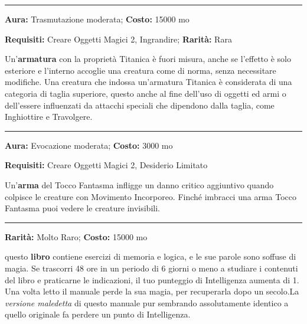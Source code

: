 \begin{multicols}{2}
\smallskip\noindent\rule{\linewidth}{2pt}  \hypertarget{Armatura Titanica}{}\medskip{}\noindent\label{ArmaturaTitanica}

\textbf{Aura:} Trasmutazione moderata; \textbf{Costo:} 15000 mo

\textbf{Requisiti:} Creare Oggetti Magici 2, Ingrandire; \textbf{Rarità:} Rara

Un'\textbf{armatura} con la proprietà Titanica è fuori misura, anche se l'effetto è solo esteriore e l'interno accoglie una creatura come di norma, senza necessitare modifiche. Una creatura che indossa un'armatura Titanica è considerata di una categoria di taglia superiore, questo anche al fine dell'uso di oggetti ed armi o dell'essere influenzati da attacchi speciali che dipendono dalla taglia, come Inghiottire e Travolgere.

\smallskip\noindent\rule{\linewidth}{2pt}  \hypertarget{ToccoFantasma}{}\medskip{}\noindent\label{ToccoFantasma}

\textbf{Aura:} Evocazione moderata; \textbf{Costo:} 3000 mo

\textbf{Requisiti:} Creare Oggetti Magici 2, Desiderio Limitato

Un'\textbf{arma} del Tocco Fantasma infligge un danno critico aggiuntivo quando colpisce le creature con Movimento Incorporeo. Finché imbracci una arma Tocco Fantasma puoi vedere le creature invisibili.

\smallskip\noindent\rule{\linewidth}{2pt}  \hypertarget{TomodelPensieroLimpido}{}\medskip{}\noindent\label{TomodelPensieroLimpido}

\textbf{Rarità:} Molto Raro; \textbf{Costo:} 15000 mo

questo \textbf{libro} contiene esercizi di memoria e logica, e le sue parole sono soffuse di magia. Se trascorri 48 ore in un periodo di 6 giorni o meno a studiare i contenuti del libro e praticarne le indicazioni, il tuo punteggio di Intelligenza aumenta di 1. Una volta letto il manuale perde la sua magia, per recuperarla dopo un secolo.La \emph{versione maledetta} di questo manuale pur sembrando assolutamente identico a quello originale fa perdere un punto di Intelligenza.


\end{multicols}
